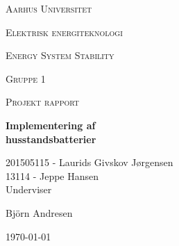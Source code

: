 \thispagestyle{empty}
	{\centering
	{\scshape\LARGE Aarhus Universitet \par}
	\vspace{1cm}
	{\scshape\Large Elektrisk energiteknologi\par}
	\vspace{0.5cm}
	{\scshape\Large Energy System Stability\par}
	{\scshape\Large Gruppe 1\par}
	{\scshape\Large Projekt rapport\par}
	\vspace{1.5cm}
	{\huge\bfseries Implementering af\\ husstandsbatterier\par}
	\vspace{2cm}
	{\Large
	201505115 - Laurids Givskov Jørgensen\\
	13114 - Jeppe Hansen\\   }
	\vfill
	Underviser\par
	Björn Andresen

	\vfill

	{\large \today\par}
\par}